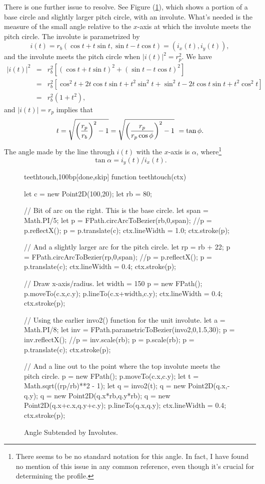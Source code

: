 \documentclass[10pt]{article}
\begin{document}
There is one further issue to resolve. See Figure (\ref{fig-teeth-touch}),
which shows a portion of a base circle and slightly larger pitch
circle, with an involute. What's needed is the measure of the small
angle relative to the $x$-axis at which the involute meets the pitch
circle. The involute is parametrized by 
$$i(t) = r_b(\cos t + t\sin t,\sin t - t\cos t) = (i_x(t),i_y(t)),$$
and the involute meets the pitch circle when $|i(t)|^2 = r_p^2$. We have
\begin{eqnarray*}
|i(t)|^2 &=& r_b^2\left[(\cos t + t\sin t)^2 + (\sin t - t\cos t)^2\right] \\
&=& r_b^2\left[\cos^2 t + 2t\cos t\sin t + t^2\sin^2t + 
  \sin^2 t - 2t\cos t\sin t + t^2\cos^2 t\right] \\
&=& r_b^2(1 + t^2),
\end{eqnarray*}
and $|i(t)| = r_p$ implies that
$$t = \sqrt{\left({r_p\over r_b}\right)^2-1} = \sqrt{\left({r_p\over
    r_p\cos\phi}\right)^2-1}\  = \tan\phi.$$
The angle made by the line through $i(t)$ with the $x$-axis is
$\alpha$, where\footnote{There
  seems to be no standard notation for this angle. In fact, I have
  found no mention of this issue in any common reference, even though it's crucial for
  determining the profile.} 
$$\tan\alpha = i_y(t)/i_x(t).$$

\begin{figure}
\begin{figput}{teethtouch,100bp}[done,skip]
function teethtouch(ctx) {

  let c = new Point2D(100,20);
  let rb = 80;

  // Bit of arc on the right. This is the base circle.
  let span = Math.PI/5;
  let p = FPath.circArcToBezier(rb,0,span);
  //p = p.reflectX();
  p = p.translate(c);
  ctx.lineWidth = 1.0;
  ctx.stroke(p);

  // And a slightly larger arc for the pitch circle.
  let rp = rb + 22;
  p = FPath.circArcToBezier(rp,0,span);
  //p = p.reflectX();
  p = p.translate(c);
  ctx.lineWidth = 0.4;
  ctx.stroke(p);
    
  // Draw x-axis/radius.
  let width = 150
  p = new FPath();
  p.moveTo(c.x,c.y);
  p.lineTo(c.x+width,c.y);
  ctx.lineWidth = 0.4;
  ctx.stroke(p);
  
  // Using the earlier invo2() function for the unit involute.
  let a = Math.PI/8;
  let inv = FPath.parametricToBezier(invo2,0,1.5,30);
  p = inv.reflectX();
  //p = inv.scale(rb);
  p = p.scale(rb);
  p = p.translate(c);
  ctx.stroke(p);

  // And a line out to the point where the top involute meets the pitch circle.
  p = new FPath();
  p.moveTo(c.x,c.y);
  let t = Math.sqrt((rp/rb)**2 - 1);
  let q = invo2(t);
  q = new Point2D(q.x,-q.y);
  q = new Point2D(q.x*rb,q.y*rb);
  q = new Point2D(q.x+c.x,q.y+c.y);
  p.lineTo(q.x,q.y);
  ctx.lineWidth = 0.4;
  ctx.stroke(p);
}
\end{figput}
\caption{Angle Subtended by Involutes.}
\label{fig-teeth-touch}
\end{figure}
\end{document}
